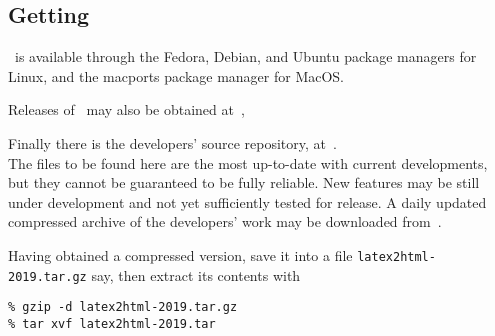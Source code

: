 \subsection[center]{Getting \protect\latextohtml}
\tableofchildlinks*
\htmlrule
\latextohtml\ is available through the Fedora, Debian, and Ubuntu
package managers for Linux, and the macports package manager for MacOS.

%
Releases of \latextohtml\ may also be obtained at
\,,

\bigskip
{}\label{cvsrepos}%
\noindent
Finally there is the \latextohtml{} developers' source repository, at \CVSrepos\,.\\
The files to be found here are the most up-to-date with current developments,
but they cannot be guaranteed to be fully reliable. New features may be
still under development and not yet sufficiently tested for release.
A daily updated compressed archive of the developers' work may be
downloaded from \CVSlatest\,.

\htmlrule{}%
\medskip\noindent
Having obtained a compressed  version, save it into a file 
\texttt{latex2html-2019.tar.gz} say,
then extract its contents with 
\begin{small}
\begin{verbatim}
% gzip -d latex2html-2019.tar.gz
% tar xvf latex2html-2019.tar
\end{verbatim} 
\end{small}
%

